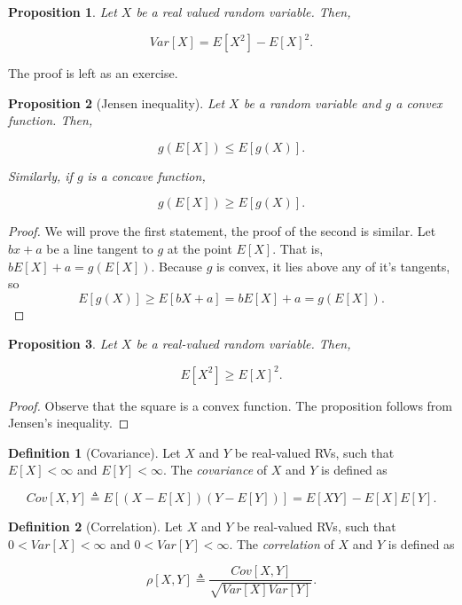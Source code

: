 \documentclass{book}
\theoremstyle{plain}%
\newtheorem{proposition}{Proposition}[section]
\theoremstyle{definition}
\newtheorem{definition}{Definition}[section]
\begin{document}
\begin{proposition}
Let $X$ be a real valued random variable. Then,

$$Var[X] = E[X^2] - E[X]^2.$$\label{prop:variance}
\end{proposition}

The proof is left as an exercise.

\begin{proposition}[Jensen inequality]
Let $X$ be a random variable and $g$ a convex function. Then,

$$g(E[X]) \leq E[g(X)].$$

Similarly, if $g$ is a concave function,

$$g(E[X]) \geq E[g(X)].$$

\end{proposition}

\begin{proof}
We will prove the first statement, the proof of the second is similar. Let $bx + a$ be a line tangent to $g$ at the point $E[X]$. That is, $bE[X] + a = g(E[X])$. Because $g$ is convex, it lies above any of it's tangents, so
$$E[g(X)] \geq E[bX + a] = bE[X] + a = g(E[X]).$$ 
\end{proof}


\begin{proposition}
Let $X$ be a real-valued random variable. Then, 

$$E[X^2] \geq E[X]^2.$$\label{prop:varsum}
\end{proposition}

\begin{proof}
Observe that the square is a convex function. The proposition follows from Jensen's inequality.
\end{proof}

\begin{definition}[Covariance] Let $X$ and $Y$ be real-valued RVs, such that $E[X] < \infty$ and $E[Y] < \infty$.  The \emph{covariance} of $X$ and $Y$ is defined as

$$Cov[X,Y] \triangleq E[(X - E[X])(Y - E[Y])] = E[XY] - E[X]E[Y].$$
\end{definition}

\begin{definition}[Correlation]
Let $X$ and $Y$ be real-valued RVs, such that $0 < Var[X] < \infty$ and $0 < Var[Y] < \infty$. The \emph{correlation} of $X$ and $Y$ is defined as

$$\rho[X,Y] \triangleq \frac{Cov[X,Y]}{\sqrt{Var[X]Var[Y]}}.$$
\end{definition}
\end{document}
